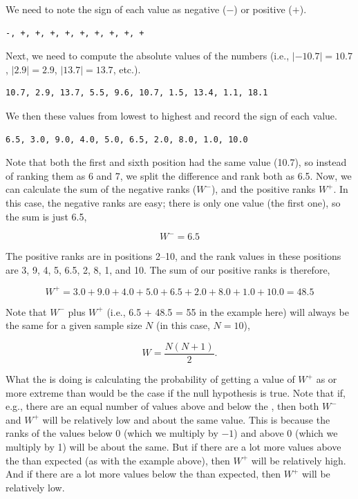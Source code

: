 \documentclass[
  openany]{krantz}
\begin{document}
We need to note the sign of each value as negative (\(-\)) or positive (\(+\)).

\begin{verbatim}
-, +, +, +, +, +, +, +, +, +
\end{verbatim}

Next, we need to compute the absolute values of the numbers (i.e., \(|-10.7| = 10.7\), \(|2.9| = 2.9\), \(|13.7| = 13.7\), etc.).

\begin{verbatim}
10.7, 2.9, 13.7, 5.5, 9.6, 10.7, 1.5, 13.4, 1.1, 18.1
\end{verbatim}

We then  these values from lowest to highest and record the sign of each value.

\begin{verbatim}
6.5, 3.0, 9.0, 4.0, 5.0, 6.5, 2.0, 8.0, 1.0, 10.0
\end{verbatim}

Note that both the first and sixth position had the same value (10.7), so instead of ranking them as 6 and 7, we split the difference and rank both as 6.5.
Now, we can calculate the sum of the negative ranks (\(W^{-}\)), and the positive ranks \(W^{+}\).
In this case, the negative ranks are easy; there is only one value (the first one), so the sum is just 6.5,

\[W^{-} = 6.5\]

The positive ranks are in positions 2--10, and the rank values in these positions are 3, 9, 4, 5, 6.5, 2, 8, 1, and 10.
The sum of our positive ranks is therefore,

\[W^{+} = 3.0 + 9.0 + 4.0 + 5.0 + 6.5 + 2.0 + 8.0 + 1.0 + 10.0 = 48.5\]

Note that \(W^{-}\) plus \(W^{+}\) (i.e., 6.5 + 48.5 = 55 in the example here) will always be the same for a given sample size \(N\) (in this case, \(N = 10\)),

\[W = \frac{N \left(N + 1 \right)}{2}.\]

What the  is doing is calculating the probability of getting a value of \(W^{+}\) as or more extreme than would be the case if the null hypothesis is true.
Note that if, e.g., there are an equal number of values above and below the , then both \(W^{-}\) and \(W^{+}\) will be relatively low and about the same value.
This is because the ranks of the values below 0 (which we multiply by \(-1\)) and above 0 (which we multiply by 1) will be about the same.
But if there are a lot more values above the  than expected (as with the example above), then \(W^{+}\) will be relatively high.
And if there are a lot more values below the  than expected, then \(W^{+}\) will be relatively low.
\end{document}
